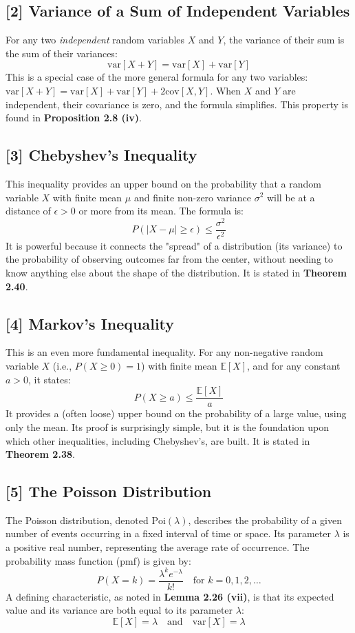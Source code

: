 \documentclass[11pt,a4paper]{article}
\begin{document}
\hypertarget{concept2}{\subsection*{[2] Variance of a Sum of Independent Variables}}
For any two \textit{independent} random variables $X$ and $Y$, the variance of their sum is the sum of their variances:
\[ \text{var}[X + Y] = \text{var}[X] + \text{var}[Y] \]
This is a special case of the more general formula for any two variables: $\text{var}[X+Y] = \text{var}[X] + \text{var}[Y] + 2\text{cov}[X, Y]$. When $X$ and $Y$ are independent, their covariance is zero, and the formula simplifies. This property is found in \textbf{Proposition 2.8 (iv)}.

\hypertarget{concept3}{\subsection*{[3] Chebyshev's Inequality}}
This inequality provides an upper bound on the probability that a random variable $X$ with finite mean $\mu$ and finite non-zero variance $\sigma^2$ will be at a distance of $\epsilon > 0$ or more from its mean. The formula is:
\[ P(|X - \mu| \geq \epsilon) \leq \frac{\sigma^2}{\epsilon^2} \]
It is powerful because it connects the "spread" of a distribution (its variance) to the probability of observing outcomes far from the center, without needing to know anything else about the shape of the distribution. It is stated in \textbf{Theorem 2.40}.

\hypertarget{concept4}{\subsection*{[4] Markov's Inequality}}
This is an even more fundamental inequality. For any non-negative random variable $X$ (i.e., $P(X \ge 0) = 1$) with finite mean $\mathbb{E}[X]$, and for any constant $a > 0$, it states:
\[ P(X \geq a) \leq \frac{\mathbb{E}[X]}{a} \]
It provides a (often loose) upper bound on the probability of a large value, using only the mean. Its proof is surprisingly simple, but it is the foundation upon which other inequalities, including Chebyshev's, are built. It is stated in \textbf{Theorem 2.38}.

\hypertarget{concept5}{\subsection*{[5] The Poisson Distribution}}
The Poisson distribution, denoted $\text{Poi}(\lambda)$, describes the probability of a given number of events occurring in a fixed interval of time or space. Its parameter $\lambda$ is a positive real number, representing the average rate of occurrence. The probability mass function (pmf) is given by:
\[ P(X=k) = \frac{\lambda^k e^{-\lambda}}{k!} \quad \text{for } k=0, 1, 2, \ldots \]
A defining characteristic, as noted in \textbf{Lemma 2.26 (vii)}, is that its expected value and its variance are both equal to its parameter $\lambda$:
\[ \mathbb{E}[X] = \lambda \quad \text{and} \quad \text{var}[X] = \lambda \]
\end{document}
